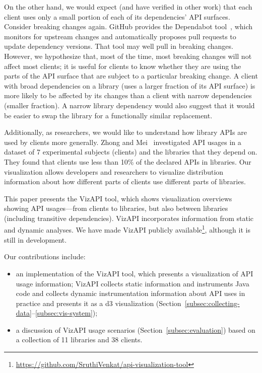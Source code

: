 On the other hand, we would expect (and have verified in other work) that each client uses only a small portion of each of its dependencies' API surfaces. Consider breaking changes again. GitHub provides the Dependabot tool~\cite{mullans20:_keep_depen}, which monitors for upstream changes and automatically proposes pull requests to update dependency versions. That tool may well pull in breaking changes. However, we hypothesize that, most of the time, most breaking changes will not affect most clients; it is useful for clients to know whether they are using the parts of the API surface that are subject to a particular breaking change. A client with broad dependencies on a library (uses a larger fraction of its API surface) is more likely to be affected by its changes than a client with narrow dependencies (smaller fraction). A narrow library dependency would also suggest that it would be easier to swap the library for a functionally similar replacement.

Additionally, as researchers, we would like to understand how library
APIs are used by clients more generally. Zhong and
Mei~\cite{zhong19:_empir_study_api_usages} investigated API usages in
a dataset of 7 experimental subjects (clients) and the libraries that
they depend on.  They found that clients use less than 10\% of the
declared APIs in libraries. Our visualization allows developers and
researchers to visualize distribution information about how different
parts of clients use different parts of libraries.

This paper presents the VizAPI tool, which shows visualization overviews showing API usages---from clients to libraries, but also between libraries (including transitive dependencies). VizAPI incorporates information from static and dynamic analyses.
We have made VizAPI publicly available\footnote{\url{https://github.com/SruthiVenkat/api-visualization-tool}}, although it is still in development.

Our contributions include:
\begin{itemize}
\item an implementation of the VizAPI tool, which presents a visualization of API usage information; VizAPI collects static information and instruments Java code and collects dynamic instrumentation information about API uses in practice and presents it as a d3 visualization (Section~\ref{subsec:collecting-data}--\ref{subsec:vis-system});
\item a discussion of VizAPI usage scenarios (Section~\ref{subsec:evaluation}) based on a collection of 11 libraries and 38 clients.
\end{itemize}


